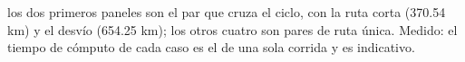 {los dos primeros paneles son el par que cruza el ciclo, con la ruta corta (370.54 km) y el desvío (654.25 km); los otros cuatro son pares de ruta única.}
{Medido: el tiempo de cómputo de cada caso es el de una sola corrida y es indicativo.}
